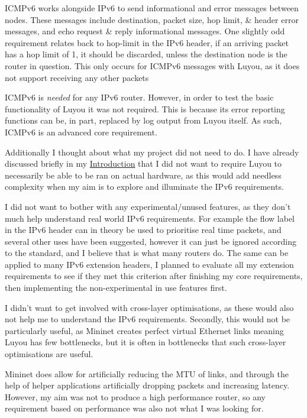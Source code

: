 \documentclass[12pt,a4paper,twoside,openright]{report}
\begin{document}
\bigskip

ICMPv6 works alongside IPv6 to send informational and error messages between nodes.  These messages include destination, packet size, hop limit, \& header error messages, and echo request \& reply informational messages. One slightly odd requirement relates back to hop-limit in the IPv6 header, if an arriving packet has a hop limit of 1, it should be discarded, unless the destination node is the router in question.  This only occurs for ICMPv6 messages with Luyou, as it does not support receiving any other packets

ICMPv6 is \textit{needed} for any IPv6 router.  However, in order to test the basic functionality of Luyou it was not required. This is because its error reporting functions can be, in part, replaced by log output from Luyou itself. As such, ICMPv6 is an advanced core requirement.

\bigskip

Additionally I thought about what my project did not need to do. I have already discussed briefly in my \hyperref[chap::introduction]{Introduction} that I did not want to require Luyou to necessarily be able to be ran on actual hardware, as this would add needless complexity when my aim is to explore and illuminate the IPv6 requirements. 

I did not want to bother with any experimental/unused features, as they don't much help understand real world IPv6 requirements. For example the flow label in the IPv6 header can in theory be used to prioritise real time packets, and several other uses have been suggested, however it can just be ignored according to the standard, and I believe that is what many routers do.  The same can be applied to many IPv6 extension headers, I planned to evaluate all my extension requirements to see if they met this criterion after finishing my core requirements, then implementing the non-experimental in use features first.

I didn't want to get involved with cross-layer optimisations, as these would also not help me to understand the IPv6 requirements.  Secondly, this would not be particularly useful, as Mininet creates perfect virtual Ethernet links meaning Luyou has few bottlenecks, but it is often in bottlenecks that such cross-layer optimisations are useful.

Mininet does allow for artificially reducing the MTU of links, and through the help of helper applications artificially dropping packets and increasing latency.  However, my aim was not to produce a high performance router, so any requirement based on performance was also not what I was looking for.
\end{document}
